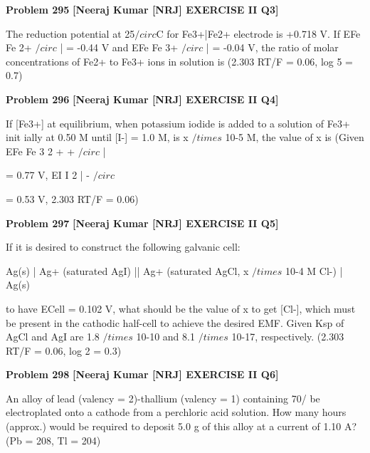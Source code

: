 \begin{problembox}
\textbf{Problem 295} \hfill \textbf{[Neeraj Kumar [NRJ] EXERCISE II Q3]}
\label{q:ext-nrj_all_questions-295}

The reduction potential at 25$/circ$C for Fe3+|Fe2+ 
electrode is +0.718 V. If EFe
Fe
2+
$/circ$
|
= -0.44 V and 
EFe
Fe
3+
$/circ$
|
= -0.04 V, the ratio of molar concentrations 
of Fe2+ to Fe3+ ions in solution is (2.303 RT/F = 
0.06, log 5 = 0.7)
\end{problembox}

\begin{problembox}
\textbf{Problem 296} \hfill \textbf{[Neeraj Kumar [NRJ] EXERCISE II Q4]}
\label{q:ext-nrj_all_questions-296}

If [Fe3+] at equilibrium, when potassium iodide is 
added to a solution of Fe3+ init ially at 0.50 M until 
[I-] = 1.0 M, is x $/times$ 10-5 M, the value of x is (Given 
EFe
Fe
3
2
+
+
$/circ$
|
 
= 0.77 V, EI I
2 | -
$/circ$
 
= 0.53 V, 2.303 RT/F = 0.06)
\end{problembox}

\begin{problembox}
\textbf{Problem 297} \hfill \textbf{[Neeraj Kumar [NRJ] EXERCISE II Q5]}
\label{q:ext-nrj_all_questions-297}

If it is desired to construct the following galvanic 
cell:
 
   Ag(s) | Ag+ (saturated AgI) || Ag+ (saturated 
AgCl, x $/times$ 10-4 M Cl-) | Ag(s)
 
 to have ECell = 0.102 V, what should be the value of 
x to get [Cl-], which must be present in the cathodic 
half-cell to achieve the desired EMF. Given Ksp 
of AgCl and AgI are 1.8 $/times$ 10-10 and 8.1 $/times$ 10-17, 
respectively. (2.303 RT/F = 0.06, log 2 = 0.3)
\end{problembox}

\begin{problembox}
\textbf{Problem 298} \hfill \textbf{[Neeraj Kumar [NRJ] EXERCISE II Q6]}
\label{q:ext-nrj_all_questions-298}

An alloy of lead (valency = 2)-thallium (valency = 
1) containing 70/%
be electroplated onto a cathode from a perchloric 
acid solution. How many hours (approx.) would 
be required to deposit 5.0 g of this alloy at a 
current of 1.10 A? (Pb = 208, Tl = 204)
\end{problembox}

